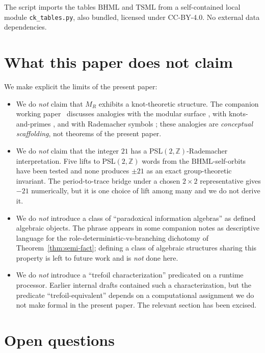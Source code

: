 \documentclass[11pt,reqno]{amsart}
\theoremstyle{plain}
\theoremstyle{definition}
\theoremstyle{remark}
\newcommand{\Z}{\mathbb{Z}}
\newcommand{\TS}{\mathrm{TSML}}
\newcommand{\BH}{\mathrm{BHML}}
\begin{document}
The script imports the tables $\BH$ and $\TS$ from a self-contained
local module \texttt{ck\_tables.py}, also bundled, licensed under
CC-BY-4.0. No external data dependencies.

\section{What this paper does not claim}

We make explicit the limits of the present paper:
\begin{itemize}\setlength\itemsep{2pt}
\item We do \emph{not} claim that $M_R$ exhibits a knot-theoretic
structure. The companion working paper~\cite{FourCore} discusses
analogies with the modular surface
\cite{KatokUgarcovici2007}, with knots-and-primes
\cite{Morishita2024}, and with Rademacher symbols
\cite{MatsusakaUeki2023, Burrin2024}; these analogies are
\emph{conceptual scaffolding}, not theorems of the present paper.
\item We do \emph{not} claim that the integer $21$ has a
PSL$(2, \Z)$-Rademacher interpretation. Five lifts to PSL$(2,
\Z)$ words from the $\BH$-self-orbits have been tested and none
produces $\pm 21$ as an exact group-theoretic invariant. The
period-to-trace bridge under a chosen $2 \times 2$ representative
gives $-21$ numerically, but it is one choice of lift among many
and we do not derive it.
\item We do \emph{not} introduce a class of ``paradoxical
information algebras'' as defined algebraic objects. The phrase
appears in some companion notes as descriptive language for the
role-deterministic-vs-branching dichotomy of
Theorem~\ref{thm:semi-fact}; defining a class of algebraic
structures sharing this property is left to future work and is
\emph{not} done here.
\item We do \emph{not} introduce a ``trefoil characterization''
predicated on a runtime processor. Earlier internal drafts
contained such a characterization, but the predicate
``trefoil-equivalent'' depends on a computational assignment we
do not make formal in the present paper. The relevant section
has been excised.
\end{itemize}

\section{Open questions}
\end{document}
